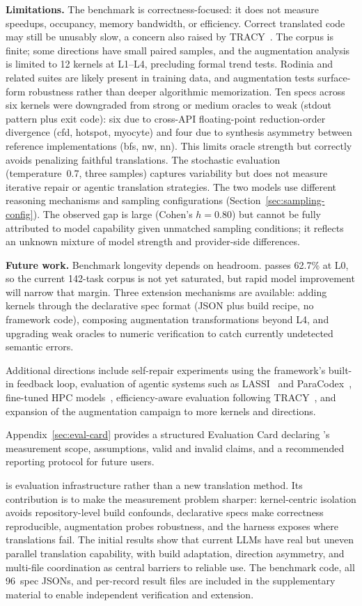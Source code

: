 \textbf{Limitations.} The benchmark is correctness-focused: it does not measure speedups, occupancy, memory bandwidth, or efficiency. Correct translated code may still be unusably slow, a concern also raised by TRACY~\cite{TRACY2025}. The corpus is finite; some directions have small paired samples, and the augmentation analysis is limited to 12 kernels at L1--L4, precluding formal trend tests. Rodinia and related suites are likely present in training data, and augmentation tests surface-form robustness rather than deeper algorithmic memorization. Ten specs across six kernels were downgraded from strong or medium oracles to weak (stdout pattern plus exit code): six due to cross-API floating-point reduction-order divergence (cfd, hotspot, myocyte) and four due to synthesis asymmetry between reference implementations (bfs, nw, nn). This limits oracle strength but correctly avoids penalizing faithful translations. The stochastic evaluation (temperature~0.7, three samples) captures variability but does not measure iterative repair or agentic translation strategies. The two models use different reasoning mechanisms and sampling configurations (Section~\ref{sec:sampling-config}). The observed gap is large (Cohen's $h = 0.80$) but cannot be fully attributed to model capability given unmatched sampling conditions; it reflects an unknown mixture of model strength and provider-side differences.

\textbf{Future work.} Benchmark longevity depends on headroom. \gptnew{} passes 62.7\% at L0, so the current 142-task corpus is not yet saturated, but rapid model improvement will narrow that margin. Three extension mechanisms are available: adding kernels through the declarative spec format (JSON plus build recipe, no framework code), composing augmentation transformations beyond L4, and upgrading weak oracles to numeric verification to catch currently undetected semantic errors.

Additional directions include self-repair experiments using the framework's built-in feedback loop, evaluation of agentic systems such as LASSI~\cite{LASSI2024} and ParaCodex~\cite{ParaCodex2026}, fine-tuned HPC models~\cite{HPCCoderV2}, efficiency-aware evaluation following TRACY~\cite{TRACY2025}, and expansion of the augmentation campaign to more kernels and directions.

Appendix~\ref{sec:eval-card} provides a structured Evaluation Card declaring \parbench{}'s measurement scope, assumptions, valid and invalid claims, and a recommended reporting protocol for future users. 

\parbench{} is evaluation infrastructure rather than a new translation method. Its contribution is to make the measurement problem sharper: kernel-centric isolation avoids repository-level build confounds, declarative specs make correctness reproducible, augmentation probes robustness, and the harness exposes where translations fail. The initial results show that current LLMs have real but uneven parallel translation capability, with build adaptation, direction asymmetry, and multi-file coordination as central barriers to reliable use. The benchmark code, all 96~spec JSONs, and per-record result files are included in the supplementary material to enable independent verification and extension.
